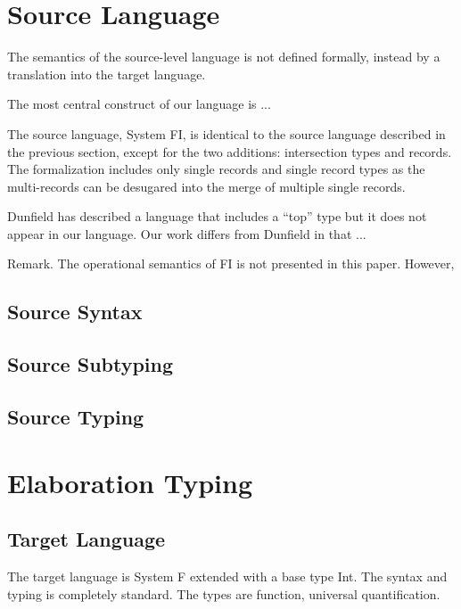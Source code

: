 \documentclass[preprint]{sigplanconf}
\begin{document}

\section{Source Language}

The semantics of the source-level language is not defined formally, instead by a
translation into the target language.

The most central construct of our language is ...


The source language, System FI, is identical to the source language described in
the previous section, except for the two additions: intersection types and
records. The formalization includes only single records and single record types as the multi-records can be desugared into the merge of multiple single records.

Dunfield has described a language that includes a ``top'' type but it does not appear in our language. Our work differs from Dunfield in that ...

Remark. The operational semantics of FI is not presented in this paper. However,

\subsection{Source Syntax}

\subsection{Source Subtyping}

\subsection{Source Typing}

\section{Elaboration Typing}

\subsection{Target Language}

The target language is System F extended with a base type Int. The syntax and
typing is completely standard. The types are function, universal quantification.
\end{document}
